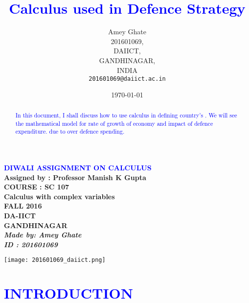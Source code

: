 \documentclass[12pt]{article}
\begin{document}
\SetWatermarkFontSize{1cm}


\title{\textcolor{blue}{Calculus used in Defence Strategy}}

\begin{center}
\Huge
{\bf \textcolor{blue}{ 
{ DIWALI ASSIGNMENT ON CALCULUS} \\
}
}
\vspace{2 cm}
\huge\bf
{ Assigned by : Professor Manish K Gupta \\
COURSE : SC 107 \\
Calculus with complex variables \\
FALL 2016 \\
DA-IICT \\
GANDHINAGAR \\
}
\vspace{5 cm}
\LARGE {\it
{ 
Made by: Amey Ghate \\
ID : 201601069 \\
}
}
\end{center}
\author{
Amey Ghate\\
201601069,\\
DAIICT,\\
GANDHINAGAR,\\
INDIA\\
\texttt{201601069@daiict.ac.in}
} 
\date{\today}

\maketitle

\begin{abstract}
\textcolor{blue}
{
\large
{
In this document, I shall discuss how to use calculus in defining country's
.
We will see the mathematical model for rate of growth of economy
and impact of defence expenditure.  
due to over defence spending. 
}
}
\end{abstract}

\begin{center}
\texttt{[image: 201601069\_daiict.png]}
\end{center}

\newpage
\large
\section{\textcolor{blue}{INTRODUCTION}}
\end{document}
